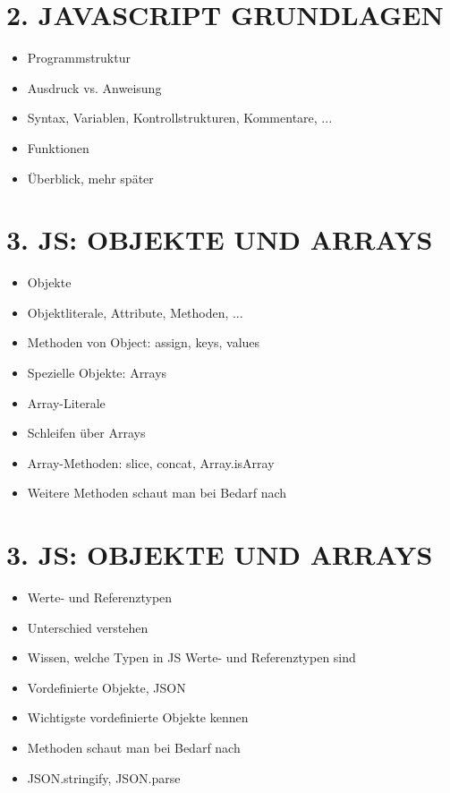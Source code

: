 \section*{2. JAVASCRIPT GRUNDLAGEN}
\begin{itemize}
  \item Programmstruktur
  \item Ausdruck vs. Anweisung
  \item Syntax, Variablen, Kontrollstrukturen, Kommentare, ...
  \item Funktionen
  \item Überblick, mehr später
\end{itemize}

\section*{3. JS: OBJEKTE UND ARRAYS}
\begin{itemize}
  \item Objekte
  \item Objektliterale, Attribute, Methoden, ...
  \item Methoden von Object: assign, keys, values
  \item Spezielle Objekte: Arrays
  \item Array-Literale
  \item Schleifen über Arrays
  \item Array-Methoden: slice, concat, Array.isArray
  \item Weitere Methoden schaut man bei Bedarf nach
\end{itemize}

\section*{3. JS: OBJEKTE UND ARRAYS}
\begin{itemize}
  \item Werte- und Referenztypen
  \item Unterschied verstehen
  \item Wissen, welche Typen in JS Werte- und Referenztypen sind
  \item Vordefinierte Objekte, JSON
  \item Wichtigste vordefinierte Objekte kennen
  \item Methoden schaut man bei Bedarf nach
  \item JSON.stringify, JSON.parse
\end{itemize}

